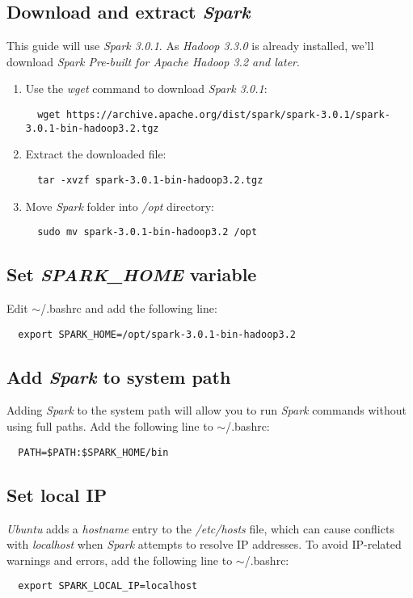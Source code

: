 \documentclass{article}
\begin{document}
  \subsection{Download and extract \emph{Spark}}
  This guide will use \emph{Spark 3.0.1}. As \emph{Hadoop 3.3.0} is
  already installed, we'll download \emph{Spark Pre-built for Apache Hadoop 3.2 and later}.
  \begin{enumerate}
  \item Use the \emph{wget} command to download \emph{Spark 3.0.1}:
  \begin{verbatim}
  wget https://archive.apache.org/dist/spark/spark-3.0.1/spark-3.0.1-bin-hadoop3.2.tgz
  \end{verbatim}

  \item Extract the downloaded file:
  \begin{verbatim}
  tar -xvzf spark-3.0.1-bin-hadoop3.2.tgz
  \end{verbatim}

  \item Move \emph{Spark} folder into \emph{/opt} directory:
  \begin{verbatim}
  sudo mv spark-3.0.1-bin-hadoop3.2 /opt
  \end{verbatim}
  \end{enumerate}

  \subsection{Set \emph{SPARK\_HOME} variable}
  Edit $\sim$/.bashrc and add the following line:
  \begin{verbatim}
  export SPARK_HOME=/opt/spark-3.0.1-bin-hadoop3.2
  \end{verbatim}
  
  \subsection{Add \emph{Spark} to system path}
  Adding \emph{Spark} to the system path will allow you to run \emph{Spark} commands without
  using full paths. Add the following line to $\sim$/.bashrc:
  \begin{verbatim}
  PATH=$PATH:$SPARK_HOME/bin
  \end{verbatim}
  
  \subsection{Set local IP}
  \emph{Ubuntu} adds a \emph{hostname} entry to the \emph{/etc/hosts} file, which can cause
  conflicts with \emph{localhost} when \emph{Spark} attempts to resolve IP addresses. To avoid
  IP-related warnings and errors, add the following line to $\sim$/.bashrc:
  \begin{verbatim}
  export SPARK_LOCAL_IP=localhost
  \end{verbatim}
\end{document}
